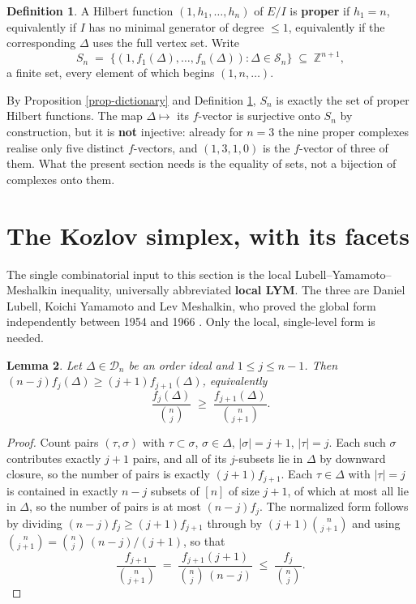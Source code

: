 \documentclass[11pt, a4paper, abstract=yes]{scrartcl}
\theoremstyle{definition}
\newtheorem{definition}{Definition}
\theoremstyle{remark}
\theoremstyle{plain}
\newtheorem{lemma}[definition]{Lemma}
\let\autocite\cite
\begin{document}
\begin{definition}
A Hilbert function \((1,h_1,\dots,h_n)\) of \(E/I\) is \textbf{proper} if \(h_1=n\), equivalently if \(I\)
has no minimal generator of degree \(\le1\), equivalently if the corresponding \(\Delta\) uses the
full vertex set. Write
\begin{equation}\label{eq:proper}
  S_n\;=\;\bigl\lbrace(1,f_1(\Delta),\dots,f_n(\Delta)):\Delta\in\mathcal S_n\bigr\rbrace
   \;\subseteq\;\mathbb Z^{n+1},
\end{equation}
a finite set, every element of which begins \((1,n,\dots)\).
\label{def-proper}
\end{definition}

By Proposition \ref{prop-dictionary} and Definition \ref{def-proper}, \(S_n\) is exactly the set of
proper Hilbert functions. The map \(\Delta\mapsto\) its \(f\)-vector is surjective onto \(S_n\) by
construction, but it is \textbf{not} injective: already for \(n=3\) the nine proper complexes realise only
five distinct \(f\)-vectors, and \((1,3,1,0)\) is the \(f\)-vector of three of them. What the
present section needs is the equality of sets, not a bijection of complexes onto them.
\section{The Kozlov simplex, with its facets}
\label{sec-kozlov}
The single combinatorial input to this section is the local Lubell--Yamamoto--Meshalkin inequality,
universally abbreviated \textbf{local LYM}. The three are Daniel Lubell, Koichi Yamamoto and Lev
Meshalkin, who proved the global form independently between 1954 and 1966 \autocite{Lubell1966,Meshalkin1963,Yamamoto1954}. Only the local, single-level form is needed.

\begin{lemma}
Let \(\Delta\in\mathcal D_n\) be an order ideal and \(1\le j\le n-1\). Then
\((n-j)f_j(\Delta)\ge(j+1)f_{j+1}(\Delta)\), equivalently
\begin{equation}\label{eq:lym}
  \frac{f_j(\Delta)}{\binom nj}\;\ge\;\frac{f_{j+1}(\Delta)}{\binom n{j+1}}.
\end{equation}
\label{lem:lym}
\label{lem-lym}
\end{lemma}

\begin{proof}
Count pairs \((\tau,\sigma)\) with \(\tau\subset\sigma\), \(\sigma\in\Delta\), \(|\sigma|=j+1\),
\(|\tau|=j\). Each such \(\sigma\) contributes exactly \(j+1\) pairs, and all of its \(j\)-subsets
lie in \(\Delta\) by downward closure, so the number of pairs is exactly \((j+1)f_{j+1}\). Each
\(\tau\in\Delta\) with \(|\tau|=j\) is contained in exactly \(n-j\) subsets of \([n]\) of size
\(j+1\), of which at most all lie in \(\Delta\), so the number of pairs is at most \((n-j)f_j\). The
normalized form follows by dividing \((n-j)f_j\ge(j+1)f_{j+1}\) through by
\((j+1)\binom n{j+1}\) and using \(\binom n{j+1}=\binom nj\,(n-j)/(j+1)\), so that
\begin{equation}\label{eq:lym-2}
  \frac{f_{j+1}}{\binom n{j+1}}\;=\;\frac{f_{j+1}(j+1)}{\binom nj\,(n-j)}
  \;\le\;\frac{f_j}{\binom nj}.
\end{equation}
\end{proof}
\end{document}
